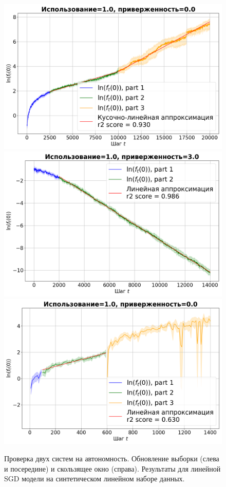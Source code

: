     \begin{figure}[h!]
        \centering
        \includegraphics[width=0.32\linewidth]{pictures/aut_su_synthetic_sgd_model_50_1.0_0.0.png}
        \includegraphics[width=0.32\linewidth]{pictures/aut_su_synthetic_sgd_model_50_1.0_3.0.png}
        \includegraphics[width=0.32\linewidth]{pictures/aut_sw_synthetic_sgd_model_50_1.0_0.0.png}
        
        \caption{Проверка двух систем на автономность. Обновление выборки (слева и посередине) и скользящее окно (справа). Результаты для линейной SGD модели на синтетическом линейном наборе данных.}
        \label{fig_exp_4_1}
    \end{figure}

